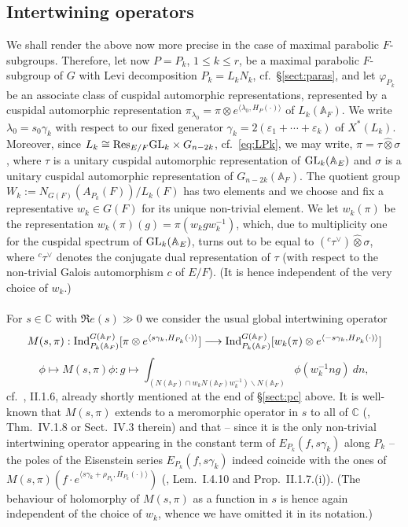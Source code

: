\documentclass[a4paper,10pt]{amsart}
\theoremstyle{definition}
\numberwithin{equation}{section}
\def\A{\mathbb A}
\def\C{\mathbb C}
\def\Res{{\rm Res}}
\def\<{\langle}
\def\>{\rangle}
\def\GL{{\rm GL}}
\begin{document}
\subsection{Intertwining operators}\label{sect:intops}
We shall render the above now more precise in the case of maximal parabolic $F$-subgroups. Therefore, let now $P=P_k$, $1\leq k\leq r$, be a maximal parabolic $F$-subgroup of $G$ with Levi decomposition $P_k=L_kN_k$, cf.\ \S \ref{sect:paras}, and let $\varphi_{P_k}$ be an associate class of cuspidal automorphic representations, represented by a cuspidal automorphic representation $\pi_{\lambda_0}=\pi\otimes e^{\langle \lambda_0,H_{P}(\cdot)\rangle}$ of $L_k(\A_F)$. We write $\lambda_0=s_0\gamma_k$ with respect to our fixed generator $\gamma_k=2(\varepsilon_1+\cdots+\varepsilon_k)$ of $X^*(L_k)$. Moreover, since $L_k \cong  \Res_{E/F}\GL_{k}\times G_{n-2k}$, cf.\ \eqref{eq:LPk}, we may write, $\pi=\tau\hat\otimes\sigma$, where $\tau$ is a unitary cuspidal automorphic representation of $\GL_k(\A_E)$ and $\sigma$ is a unitary cuspidal automorphic representation of $G_{n-2k}(\A_F)$. The quotient group $W_k:=N_{G(F)}(A_{P_k}(F))/L_k(F)$ has two elements and we choose and fix a representative $w_k\in G(F)$ for its unique non-trivial element. We let $w_k(\pi)$ be the representation $w_k(\pi)(g)=\pi(w_k gw_k^{-1})$, which, due to multiplicity one for the cuspidal spectrum of $\GL_k(\A_E)$, turns out to be equal to $({}^c\tau^\vee)\hat\otimes\sigma$, where ${}^c\tau^\vee$ denotes the conjugate dual representation of $\tau$ (with respect to the non-trivial Galois automorphism $c$ of $E/F$). (It is hence independent of the very choice of $w_k$.)\\\\ For $s\in\C$ with $\Re e(s)\gg 0$  we consider the usual global intertwining operator
$$M(s,\pi): {\rm Ind}_{P_k(\A_F)}^{G(\A_F)}[\pi\otimes e^{\langle s\gamma_k,H_{P_k}(\cdot)\rangle}]\longrightarrow {\rm Ind}_{P_k(\A_F)}^{G(\A_F)}[w_k(\pi)\otimes e^{\langle -s\gamma_k,H_{P_k}(\cdot)\rangle}]$$
$$\phi \mapsto M(s,\pi)\phi: g\mapsto \int_{(N(\A_F)\cap w_k N(\A_F)w_k^{-1})\backslash N(\A_F)} \phi(w_k^{-1}ng) \ dn,$$
cf.\ \cite{moewal}, II.1.6, already shortly mentioned at the end of \S \ref{sect:pc} above. It is well-known that $M(s,\pi)$ extends to a meromorphic operator in $s$ to all of $\C$ (\cite{moewal}, Thm.\ IV.1.8 or Sect.\ IV.3 therein) and that -- since it is the only non-trivial intertwining operator appearing in the constant term of $E_{P_k}(f,s\gamma_k)$ along $P_k$ -- the poles of the Eisenstein series $E_{P_k}(f,s\gamma_k)$ indeed coincide with the ones of $M(s,\pi)(f\cdot e^{\<s\gamma_k+\rho_{P_k},H_{P_k}(\cdot)\>})$ (\cite{moewal}, Lem.\ I.4.10 and Prop.\ II.1.7.(i)). (The behaviour of holomorphy of $M(s,\pi)$ as a function in $s$ is hence again independent of the choice of $w_k$, whence we have omitted it in its notation.)\\\\
\end{document}
